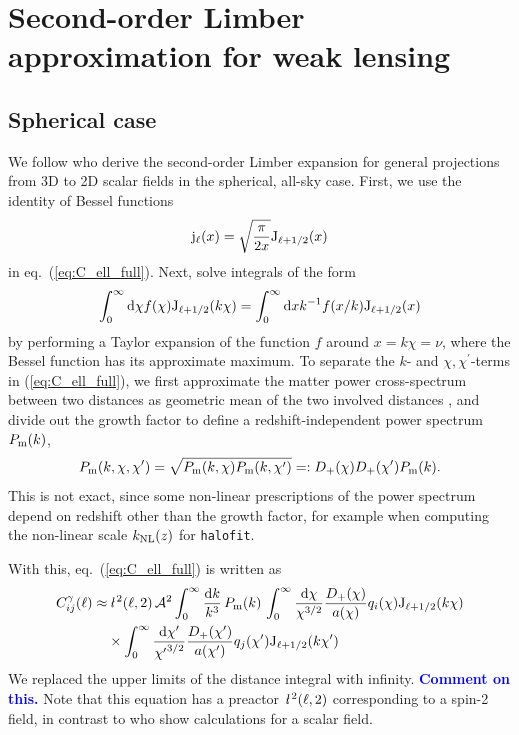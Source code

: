 \documentclass[useAMS,usenatbib]{mn2e} %
\newcommand{\ellbar}{\hbox{\it \l}\,}
\newcommand{\pref}{{\cal A}}
\newcommand{\mk}[1]{{\bf\textcolor{blue}{#1}}}
\begin{document}
\section{Second-order Limber approximation for weak lensing}
\label{sec:L2}

\subsection{Spherical case}

We follow \cite{2008PhRvD..78l3506L} who derive the second-order Limber
expansion for general projections from 3D to 2D scalar fields in the spherical,
all-sky case. First, we use the identity of Bessel functions
%
\begin{equation}
  {\rm j}_\ell(x) = \sqrt{\frac{\pi}{2x}} {\rm J}_{\ell + 1/2}(x)
\end{equation}
%
in eq.~(\ref{eq:C_ell_full}). Next, \cite{2008PhRvD..78l3506L} solve
integrals of the form
%
\begin{equation}
  \int_0^\infty {\rm d} \chi f(\chi) {\rm J}_{\ell + 1/2}(k \chi)
  = \int_0^\infty {\rm d} x k^{-1} f(x/k) {\rm J}_{\ell + 1/2}(x)
  \label{eq:int_dchi}
\end{equation}
%
by performing a Taylor expansion of the function $f$ around $x = k \chi = \nu$, where
the Bessel function has its approximate maximum. To separate the $k$- and
$\chi, \chi^\prime$-terms in (\ref{eq:C_ell_full}), we first approximate the
matter power cross-spectrum between two distances as geometric mean of the two
involved distances \cite{2016arXiv161200770K}, and divide out the growth factor
to define a redshift-independent power spectrum $P_{\rm m}(k)$,
%
\begin{equation}
 P_{\rm m}(k, \chi, \chi^\prime) = \sqrt{ P_{\rm m}(k, \chi) P_{\rm m}(k, \chi^\prime) }
    =: D_+(\chi) D_+(\chi^\prime) P_{\rm m}(k).
  \label{eq:P_geom_mean}
\end{equation}
%
This is not exact, since some non-linear prescriptions of the power spectrum
depend on redshift other than the growth factor, for example when computing the
non-linear scale $k_{\rm NL}(z)$ for \texttt{halofit}.

With this, eq.~(\ref{eq:C_ell_full}) is written as
%
\begin{align}
  C^\gamma_{ij}(\ell) \approx & \, \ellbar^2(\ell, 2) \, \pref^2
                \int_0^\infty \frac{{\rm d} k}{k^3} \, P_{\rm m}(k) \,
                \int_{0}^\infty \frac{{\rm d} \chi}{\chi^{3/2}} \frac{D_+(\chi)}{a(\chi)} q_i(\chi) {\rm J}_{\ell+1/2}(k \chi)
                \nonumber \\
                 & \times
                \int_{0}^\infty \frac{{\rm d} \chi^\prime}{{\chi^\prime}^{3/2}}
                \frac{D_+(\chi^\prime)}{a(\chi^\prime)} q_j(\chi^\prime) {\rm J}_{\ell+1/2}(k \chi^\prime)
  \label{eq:C_ell_full_Pk}
\end{align}
%
We replaced the upper limits of the distance integral with infinity. \mk{Comment on this.}
Note that this equation has a preactor $\ellbar^2(\ell, 2)$ corresponding to a spin-2 field, in contrast
to \cite{2008PhRvD..78l3506L} who show calculations for a scalar field.
\end{document}
